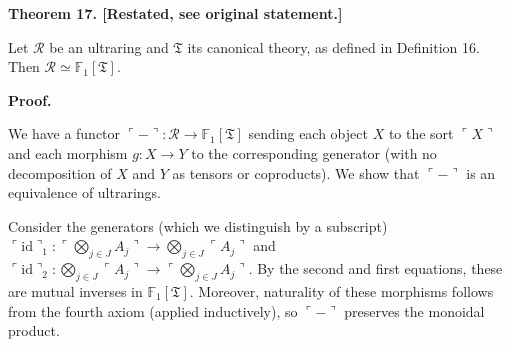  
 
 
\par\medskip\noindent\textbf{Theorem 17. [Restated, see original statement.]}\par
 
 
Let $\mathcal{R}$ be an ultraring and $\mathfrak{T}$ its canonical theory, as defined in Definition 16. Then $\mathcal{R}\simeq\mathbb{F}_{1}[\mathfrak{T}]$.\par
 
 
 
 
 
 
\par\medskip\noindent\textbf{Proof.}\par
 
 
We have a functor $\ulcorner-\urcorner:\mathcal{R}\to\mathbb{F}_{1}[\mathfrak{T}]$ sending each object $X$ to the sort $\ulcorner X\urcorner$ and each morphism $g:X\to Y$ to the corresponding generator (with no decomposition of $X$ and $Y$ as tensors or coproducts). We show that $\ulcorner-\urcorner$ is an equivalence of ultrarings.\par
 
 
 
Consider the generators (which we distinguish by a subscript) $\ulcorner\mathrm{id}\urcorner_{1}:\ulcorner\bigotimes_{j\in J}A_{j}\urcorner%
\to\bigotimes_{j\in J}\ulcorner A_{j}\urcorner$ and $\ulcorner\mathrm{id}\urcorner_{2}:\bigotimes_{j\in J}\ulcorner A_{j}\urcorner%
\to\ulcorner\bigotimes_{j\in J}A_{j}\urcorner$. By the second and first equations, these are mutual inverses in $\mathbb{F}_{1}[\mathfrak{T}]$. Moreover, naturality of these morphisms follows from the fourth axiom (applied inductively), so $\ulcorner-\urcorner$ preserves the monoidal product.\par
 
 
 
